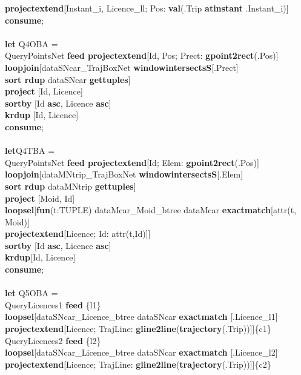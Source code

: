 \documentclass[a4paper]{article}
\newcommand{\op}[1]{\textbf{#1}}
\begin{document}
\begin{scriptsize}
\begin{tabbing}
\>\op{projectextend}[Instant\_i, Licence\_ll; Pos: \op{val}(.Trip
\op{atinstant} .Instant\_i)]\\
\op{consume};\\
\\
\op{let} Q4OBA =\\
\> QueryPointsNet \op{feed projectextend}[Id, Pos; Prect: \op{gpoint2rect}(.Pos)]\\
\>\op{loopjoin}[dataSNcar\_TrajBoxNet \op{windowintersectsS}[.Prect]\\
\>\>\>\op{sort rdup} dataSNcar \op{gettuples}]\\
\>\op{project} [Id, Licence]\\
\>\op{sortby} [Id \op{asc}, Licence \op{asc}]\\
\>\op{krdup} [Id, Licence]\\
\op{consume};\\
\\
\op{let}Q4TBA =\\
\>QueryPointsNet \op{feed projectextend}[Id; Elem: \op{gpoint2rect}(.Pos)]\\
\>\op{loopjoin}[dataMNtrip\_TrajBoxNet \op{windowintersectsS}[.Elem]\\
\>\>\>\op{sort rdup} dataMNtrip \op{gettuples}]\\
\>\op{project} [Moid, Id]\\
\>\op{loopsel}[\op{fun}(t:TUPLE) dataMcar\_Moid\_btree dataMcar \op{exactmatch}[attr(t, Moid)]\\
\>\>\op{projectextend}[Licence; Id: attr(t,Id)]]\\
\>\op{sortby} [Id \op{asc}, Licence \op{asc}]\\
\>\op{krdup}[Id, Licence]\\
\op{consume};\\
\\
\op{let} Q5OBA = \\
\>QueryLicences1 \op{feed} \{l1\}\\
\>\>\op{loopsel}[dataSNcar\_Licence\_btree dataSNcar \op{exactmatch} [.Licence\_l1]\\
\>\>\>\op{projectextend}[Licence; TrajLine: \op{gline2line}(\op{trajectory}(.Trip))]]\{c1\}\\
\>QueryLicences2 \op{feed} \{l2\}\\
\>\>\op{loopsel}[dataSNcar\_Licence\_btree dataSNcar \op{exactmatch} [.Licence\_l2]\\
\>\>\>\op{projectextend}[Licence; TrajLine: \op{gline2line}(\op{trajectory}(.Trip))]]\{c2\}\\

\end{tabbing}
\end{scriptsize}
\end{document}
